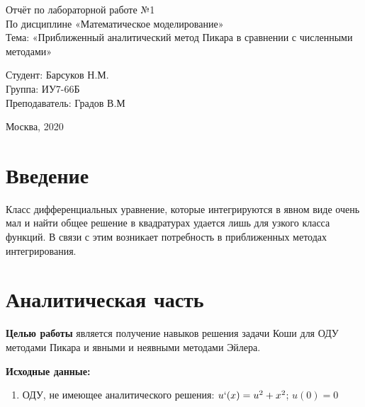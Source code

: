 \documentclass[12pt,a4paper]{scrartcl}
\begin{document}

\vspace{5cm}
\begin{center}
\Large Отчёт по лабораторной работе №1 \\ По дисциплине «Математическое моделирование» \\ Тема: «Приближенный аналитический метод Пикара в сравнении с численными методами» 
\end{center}

\vspace{6em}
\begin{flushright}
Студент: \hrulefill Барсуков Н.М. \\
\vspace{1.5em}
Группа: \hrulefill ИУ7-66Б\\
\vspace{1.5em}
Преподаватель: \hrulefill Градов В.М\\
\vspace{1.5em}
\end{flushright}
\vspace{\fill}
\begin{center}
Москва, 2020
\end{center}

\newpage
\tableofcontents

\newpage
\section{Введение}
	Класс дифференциальных уравнение, которые интегрируются в явном виде очень мал и найти общее решение в квадратурах удается лишь для узкого класса функций. 
	В связи с этим возникает потребность в приближенных методах интегрирования.
	
\section {Аналитическая часть} 

	\textbf{Целью работы} является получение навыков решения задачи Коши для ОДУ методами Пикара и явными и неявными методами Эйлера.
	
	\textbf{Исходные данные:}
	\begin{enumerate}
		\item ОДУ, не имеющее аналитического решения: \newline$u`(x) = u^2 + x^2$; \newline$u(0) = 0$
	\end{enumerate}
	
\end{document}
